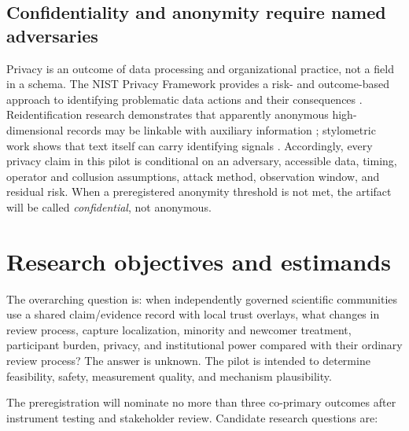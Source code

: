 \documentclass[11pt]{article}
\begin{document}
\subsection{Confidentiality and anonymity require named adversaries}

Privacy is an outcome of data processing and organizational practice, not a field
in a schema. The NIST Privacy Framework provides a risk- and outcome-based approach
to identifying problematic data actions and their consequences
\citep{nist2020privacy}. Reidentification research demonstrates that apparently
anonymous high-dimensional records may be linkable with auxiliary information
\citep{narayanan2008deanonymizing}; stylometric work shows that text itself can
carry identifying signals \citep{brennan2012stylometry}. Accordingly, every privacy
claim in this pilot is conditional on an adversary, accessible data, timing,
operator and collusion assumptions, attack method, observation window, and residual
risk. When a preregistered anonymity threshold is not met, the artifact will be
called \emph{confidential}, not anonymous.

\section{Research objectives and estimands}

The overarching question is: when independently governed scientific communities
use a shared claim/evidence record with local trust overlays, what changes in
review process, capture localization, minority and newcomer treatment, participant
burden, privacy, and institutional power compared with their ordinary review
process? The answer is unknown. The pilot is intended to determine feasibility,
safety, measurement quality, and mechanism plausibility.

The preregistration will nominate no more than three co-primary outcomes after
instrument testing and stakeholder review. Candidate research questions are:
\end{document}
